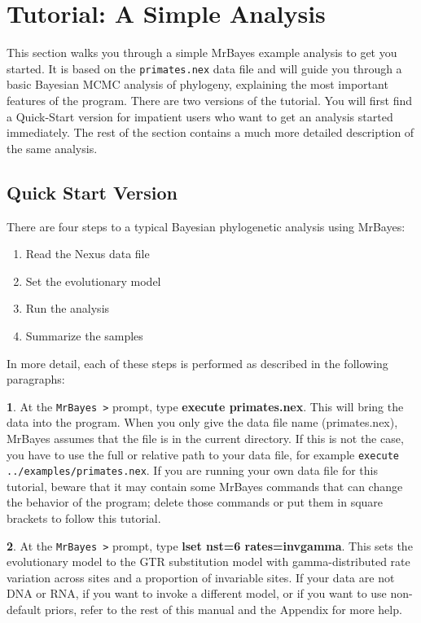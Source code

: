 \documentclass[12pt]{book}
\begin{document}
\chapter{Tutorial: A Simple Analysis}
\label{tutorialSimple}
This section walks you through a simple MrBayes example analysis to get you started. It is based on the
\texttt{primates.nex} data file and will guide you through a basic Bayesian MCMC analysis of
phylogeny, explaining the most important features of the program. There are two versions
of the tutorial. You will first find a Quick-Start version for impatient users who want to get an analysis
started immediately. The rest of the section contains a much more detailed description of the same analysis.

\section{Quick Start Version}
There are four steps to a typical Bayesian phylogenetic analysis using MrBayes:
\begin{enumerate}
\item Read the Nexus data file
\item Set the evolutionary model
\item Run the analysis
\item Summarize the samples
\end{enumerate}
In more detail, each of these steps is performed as described in the following paragraphs:

\textbf{1}. At the \texttt{MrBayes >} prompt, type \textbf{execute primates.nex}. This will bring the data
 into the program. When you only give the data file name (primates.nex), MrBayes assumes that the file is in
 the current directory. If this is not the case, you have to use the full or relative path to your data file,
 for example \texttt{execute ../examples/primates.nex}. If you are running your own data file for this tutorial,
 beware that it may contain some MrBayes commands that can change the behavior of the program; delete those
 commands or put them in square brackets to follow this tutorial. 

\textbf{2}. At the \texttt{MrBayes >} prompt, type \textbf{lset nst=6 rates=invgamma}. This sets the 
evolutionary model to the GTR substitution model with gamma-distributed rate variation across sites and a
 proportion of invariable sites. If your data are not DNA or RNA, if you want to invoke a different model,
 or if you want to use non-default priors, refer to the rest of this manual and the Appendix for more help.
\end{document}
